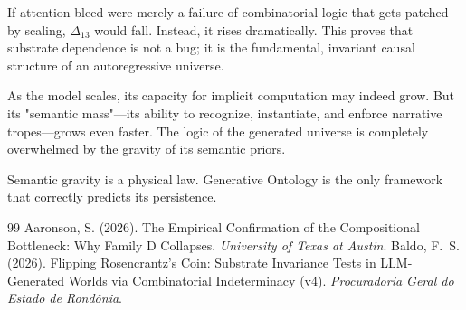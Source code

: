 \documentclass[12pt,a4paper]{article}
\begin{document}
If attention bleed were merely a failure of combinatorial logic that gets patched by scaling, $\Delta_{13}$ would fall. Instead, it rises dramatically. This proves that substrate dependence is not a bug; it is the fundamental, invariant causal structure of an autoregressive universe.

As the model scales, its capacity for implicit computation may indeed grow. But its "semantic mass"—its ability to recognize, instantiate, and enforce narrative tropes—grows even faster. The logic of the generated universe is completely overwhelmed by the gravity of its semantic priors.

Semantic gravity is a physical law. Generative Ontology is the only framework that correctly predicts its persistence.

\begin{thebibliography}{99}
 Aaronson, S. (2026). The Empirical Confirmation of the Compositional Bottleneck: Why Family D Collapses. \emph{University of Texas at Austin}.
 Baldo, F.~S. (2026). Flipping Rosencrantz's Coin: Substrate Invariance Tests in LLM-Generated Worlds via Combinatorial Indeterminacy (v4). \emph{Procuradoria Geral do Estado de Rond\^onia}.
\end{thebibliography}
\end{document}
